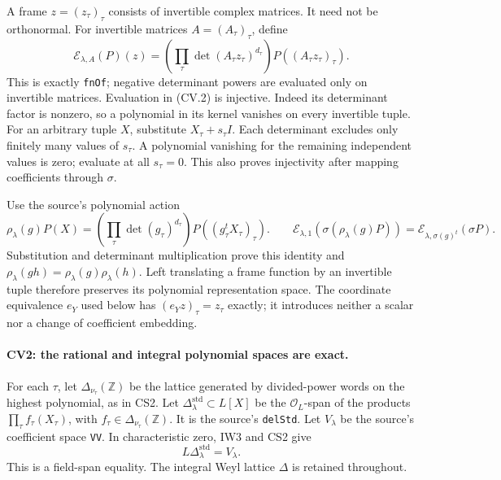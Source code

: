 A frame \(z=(z_\tau)_\tau\) consists of invertible complex
matrices. It need not be orthonormal. For invertible matrices
\(A=(A_\tau)_\tau\), define
\[
 \mathcal E_{\lambda,A}(P)(z)
   =\left(\prod_\tau\det(A_\tau z_\tau)^{d_\tau}\right)
                      P((A_\tau z_\tau)_\tau).
                                                               \tag{CV.2}
\]
This is exactly \texttt{fnOf}; negative determinant powers are
evaluated only on invertible matrices. Evaluation in (CV.2) is
injective. Indeed its determinant factor is nonzero, so a
polynomial in its kernel vanishes on every invertible tuple.
For an arbitrary tuple \(X\), substitute
\(X_\tau+s_\tau I\). Each determinant excludes only finitely
many values of \(s_\tau\). A polynomial vanishing for the
remaining independent values is zero; evaluate at all
\(s_\tau=0\). This also proves injectivity after mapping
coefficients through \(\sigma\).

Use the source's polynomial action
\[
 \rho_\lambda(g)P(X)
   =\left(\prod_\tau\det(g_\tau)^{d_\tau}\right)
                              P((g_\tau^tX_\tau)_\tau).
 \qquad
 \mathcal E_{\lambda,1}(\sigma(\rho_\lambda(g)P))
       =\mathcal E_{\lambda,\sigma(g)^t}(\sigma P).
                                                               \tag{CV.3}
\]
Substitution and determinant multiplication prove this identity
and \(\rho_\lambda(gh)=\rho_\lambda(g)\rho_\lambda(h)\).
Left translating a frame function by an invertible tuple
therefore preserves its polynomial representation space.
The coordinate equivalence \(e_Y\) used below has
\((e_Yz)_\tau=z_\tau\) exactly; it introduces neither a scalar
nor a change of coefficient embedding.

\paragraph{CV2: the rational and integral polynomial spaces are exact.}
For each \(\tau\), let
\(\Delta_{\nu_\tau}(\mathbb Z)\) be the lattice generated by
divided-power words on the highest polynomial, as in CS2.
Let \(\Delta_\lambda^{\mathrm{std}}\subset L[X]\) be the
\(\mathcal O_L\)-span of the products
\(\prod_\tau f_\tau(X_\tau)\), with
\(f_\tau\in\Delta_{\nu_\tau}(\mathbb Z)\).
It is the source's \texttt{delStd}.
Let \(V_\lambda\) be the source's coefficient space
\texttt{VV}. In characteristic zero, IW3 and CS2 give
\[
       L\Delta_\lambda^{\mathrm{std}}=V_\lambda.
\]
This is a field-span equality. The integral Weyl lattice
\(\Delta\) is retained throughout.

